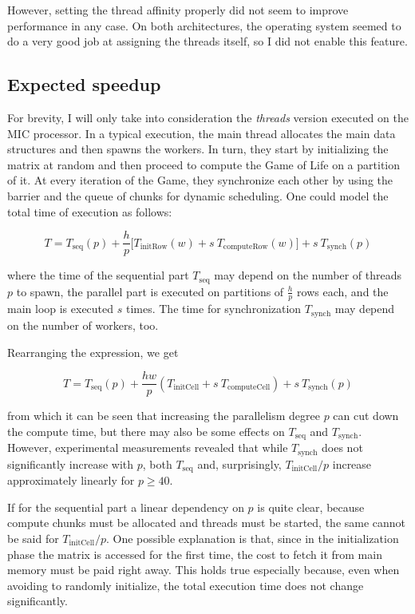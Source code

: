 \documentclass[a4paper,11pt]{article}
\begin{document}
However, setting the thread affinity properly did not seem to improve performance in any case. On both architectures, the operating system seemed to do a very good job at assigning the threads itself, so I did not enable this feature.

\subsection{Expected speedup}

For brevity, I will only take into consideration the \emph{threads} version executed on the MIC processor. In a typical execution, the main thread allocates the main data structures and then spawns the workers. In turn, they start by initializing the matrix at random and then proceed to compute the Game of Life on a partition of it. At every iteration of the Game, they synchronize each other by using the barrier and the queue of chunks for dynamic scheduling. One could model the total time of execution as follows:

\begin{equation}
T = T_{\mathrm{seq}}(p) + \frac h p \Big[ T_{\mathrm{initRow}}(w) + s \: T_{\mathrm{computeRow}}(w) \Big] + s \: T_{\mathrm{synch}}(p)
\end{equation}

where the time of the sequential part $T_{\mathrm{seq}}$ may depend on the number of threads $p$ to spawn, the parallel part is executed on partitions of $\frac h p$ rows each, and the main loop is executed $s$ times. The time for synchronization $T_{\mathrm{synch}}$ may depend on the number of workers, too.

Rearranging the expression, we get

\begin{equation}
T = T_{\mathrm{seq}}(p) + \frac{hw}{p} (T_{\mathrm{initCell}} + s \: T_{\mathrm{computeCell}}) + s \: T_{\mathrm{synch}}(p)
\end{equation}

from which it can be seen that increasing the parallelism degree $p$ can cut down the compute time, but there may also be some effects on $T_{\mathrm{seq}}$ and $T_{\mathrm{synch}}$. However, experimental measurements revealed that while $T_{\mathrm{synch}}$ does not significantly increase with $p$, both $T_{\mathrm{seq}}$ and, surprisingly, $T_{\mathrm{initCell}} / p$ increase approximately linearly for $p \geq 40$.

If for the sequential part a linear dependency on $p$ is quite clear, because compute chunks must be allocated and threads must be started, the same cannot be said for $T_{\mathrm{initCell}} / p$. One possible explanation is that, since in the initialization phase the matrix is accessed for the first time, the cost to fetch it from main memory must be paid right away. This holds true especially because, even when avoiding to randomly initialize, the total execution time does not change significantly.
\end{document}
